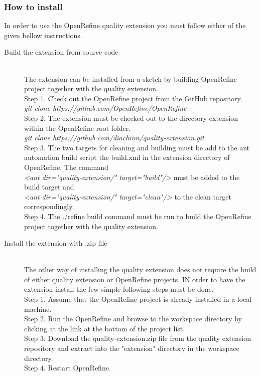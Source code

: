 \subsubsection{How to install}
In order to use the OpenRefine quality extension you must follow either of the given bellow instructions.
\begin{description}
  \item[Build the extension from source code] \hfill \\
    The extension can be installed from a sketch by building OpenRefine project together with the quality extension.\\
    
  	Step 1. Check out the OpenRefine project from the GitHub repository.\\ 
    \textit{git clone https://github.com/OpenRefine/OpenRefine}\\
  
	Step 2. The extension must be checked out to the directory extension within the OpenRefine root folder.\\
	\textit{git clone https://github.com/diachron/quality-extension.git}\\
	
	Step 3. The two targets for cleaning and building must be add to the ant automation build script the build.xml in the extension directory of OpenRefine. The command \\ \textit{<ant dir="quality-extension/" target="build"/>} must be added to the build target 	and \\ \textit{<ant dir="quality-extension/" target="clean"/>} to the clean target correspondingly.\\
	
	Step 4. The ./refine build command must be run to build the OpenRefine project together with the quality extension.
  
  \item[Install the extension with .zip file] \hfill \\
	The other way of installing the quality extension does not require the build of either quality extension or OpenRefine projects. IN order to have the extension install the few simple following steps must be done.\\
	
	Step 1. Assume that the OpenRefine project is already installed in a local machine.\\
	
	Step 2. Run the OpenRefine and browse to the workspace directory by clicking at the link at the bottom of the project list.\\
	
	Step 3. Download the quality-extension.zip file from the quality extension repository and extract into the "extension" directory in the workspace directory.\\
	
	Step 4. Restart OpenRefine.

\end{description}

